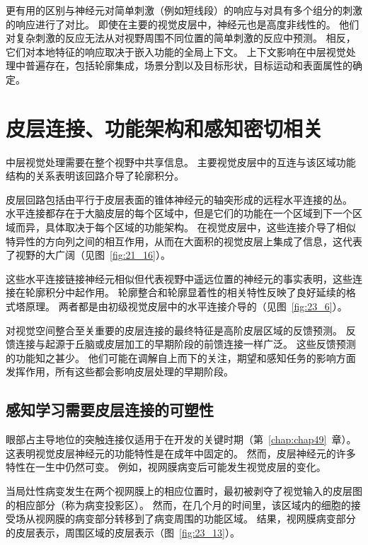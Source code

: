 更有用的区别与神经元对简单刺激（例如短线段）的响应与对具有多个组分的刺激的响应进行了对比。
即使在主要的视觉皮层中，神经元也是高度非线性的。
他们对复杂刺激的反应无法从对视野周围不同位置的简单刺激的反应中预测。
相反，它们对本地特征的响应取决于嵌入功能的全局上下文。
上下文影响在中层视觉处理中普遍存在，包括轮廓集成，场景分割以及目标形状，目标运动和表面属性的确定。



\section{皮层连接、功能架构和感知密切相关}

中层视觉处理需要在整个视野中共享信息。
主要视觉皮层中的互连与该区域功能结构的关系表明该回路介导了轮廓积分。


皮层回路包括由平行于皮层表面的锥体神经元的轴突形成的远程水平连接的丛。
水平连接都存在于大脑皮层的每个区域中，但是它们的功能在一个区域到下一个区域而异，具体取决于每个区域的功能架构。
在视觉皮层中，这些连接介导了相似特异性的方向列之间的相互作用，从而在大面积的视觉皮层上集成了信息，这代表了视野的大广阔（见图~\ref{fig:21_16}）。


这些水平连接链接神经元相似但代表视野中遥远位置的神经元的事实表明，这些连接在轮廓积分中起作用。
轮廓整合和轮廓显着性的相关特性反映了良好延续的格式塔原理。
两者都是由初级视觉皮层中的水平连接介导的（见图~\ref{fig:23_6}）。


对视觉空间整合至关重要的皮层连接的最终特征是高阶皮层区域的反馈预测。
反馈连接与起源于丘脑或皮层加工的早期阶段的前馈连接一样广泛。
这些反馈预测的功能知之甚少。
他们可能在调解自上而下的关注，期望和感知任务的影响方面发挥作用，所有这些都会影响皮层处理的早期阶段。



\subsection{感知学习需要皮层连接的可塑性}

眼部占主导地位的突触连接仅适用于在开发的关键时期（第~\ref{chap:chap49}~章）。
这表明视觉皮层神经元的功能特性是在成年中固定的。
然而，皮层神经元的许多特性在一生中仍然可变。
例如，视网膜病变后可能发生视觉皮层的变化。


当局灶性病变发生在两个视网膜上的相应位置时，最初被剥夺了视觉输入的皮层图的相应部分（称为病变投影区）。
然而，在几个月的时间里，该区域内的细胞的接受场从视网膜的病变部分转移到了病变周围的功能区域。
结果，视网膜病变部分的皮层表示，周围区域的皮层表示（图~\ref{fig:23_13}）。


